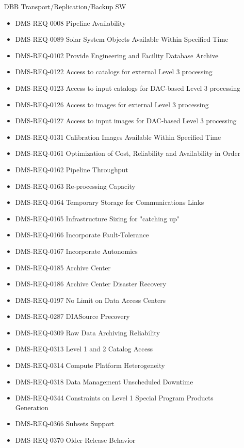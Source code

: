 DBB Transport/Replication/Backup SW \begin{itemize}
\item DMS-REQ-0008 Pipeline Availability
\item DMS-REQ-0089 Solar System Objects Available Within Specified Time
\item DMS-REQ-0102 Provide Engineering and Facility Database Archive
\item DMS-REQ-0122 Access to catalogs for external Level 3 processing
\item DMS-REQ-0123 Access to input catalogs for DAC-based Level 3 processing
\item DMS-REQ-0126 Access to images for external Level 3 processing
\item DMS-REQ-0127 Access to input images for DAC-based Level 3 processing
\item DMS-REQ-0131 Calibration Images Available Within Specified Time
\item DMS-REQ-0161 Optimization of Cost, Reliability and Availability in Order
\item DMS-REQ-0162 Pipeline Throughput
\item DMS-REQ-0163 Re-processing Capacity
\item DMS-REQ-0164 Temporary Storage for Communications Links
\item DMS-REQ-0165 Infrastructure Sizing for "catching up"
\item DMS-REQ-0166 Incorporate Fault-Tolerance
\item DMS-REQ-0167 Incorporate Autonomics
\item DMS-REQ-0185 Archive Center
\item DMS-REQ-0186 Archive Center Disaster Recovery
\item DMS-REQ-0197 No Limit on Data Access Centers
\item DMS-REQ-0287 DIASource Precovery
\item DMS-REQ-0309 Raw Data Archiving Reliability
\item DMS-REQ-0313 Level 1 and 2 Catalog Access
\item DMS-REQ-0314 Compute Platform Heterogeneity
\item DMS-REQ-0318 Data Management Unscheduled Downtime
\item DMS-REQ-0344 Constraints on Level 1 Special Program Products Generation
\item DMS-REQ-0366 Subsets Support
\item DMS-REQ-0370 Older Release Behavior
\end{itemize}
